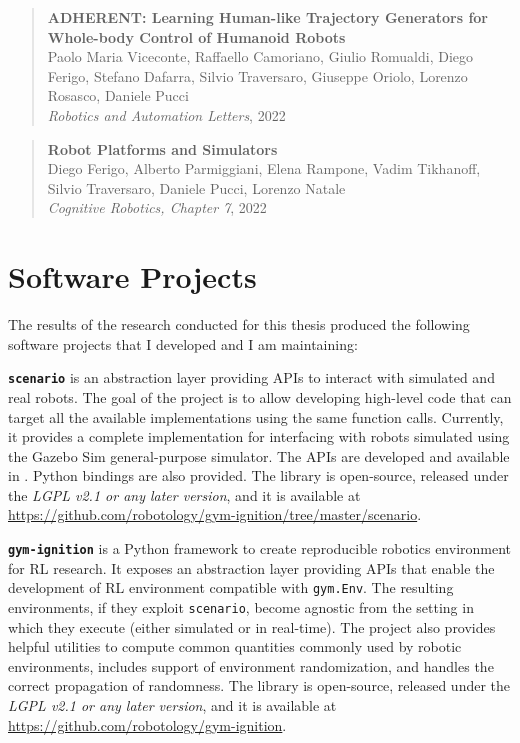 \begin{quote}
    \textbf{ADHERENT: Learning Human-like Trajectory Generators for Whole-body Control of Humanoid Robots} \\
    Paolo Maria Viceconte, Raffaello Camoriano, Giulio Romualdi, Diego Ferigo, Stefano Dafarra, Silvio Traversaro, Giuseppe Oriolo, Lorenzo Rosasco, Daniele Pucci \\
    \textit{Robotics and Automation Letters}, 2022
\end{quote}

\begin{quote}
    \textbf{Robot Platforms and Simulators} \\
    Diego Ferigo, Alberto Parmiggiani, Elena Rampone, Vadim Tikhanoff, Silvio Traversaro, Daniele Pucci, Lorenzo Natale \\
    \textit{Cognitive Robotics, Chapter 7}, 2022
\end{quote}

\section*{Software Projects}

The results of the research conducted for this thesis produced the following software projects that I developed and I am maintaining:

\vspace{3mm}
\noindent
\textbf{\texttt{scenario}} is an abstraction layer providing \acp{API} to interact with simulated and real robots. The goal of the project is to allow developing high-level code that can target all the available implementations using the same function calls. Currently, it provides a complete implementation for interfacing with robots simulated using the Gazebo Sim general-purpose simulator. The \acp{API} are developed and available in \cpp. Python bindings are also provided. The library is open-source, released under the \emph{LGPL v2.1 or any later version}, and it is available at \linebreak \url{https://github.com/robotology/gym-ignition/tree/master/scenario}.

\vspace{3mm}
\noindent
\textbf{\texttt{gym-ignition}} is a Python framework to create reproducible robotics environment for \ac{RL} research. It exposes an abstraction layer providing \acp{API} that enable the development of \ac{RL} environment compatible with \texttt{gym.Env}. The resulting environments, if they exploit \texttt{scenario},  become agnostic from the setting in which they execute (either simulated or in real-time). The project also provides helpful utilities to compute common quantities commonly used by robotic environments, includes support of environment randomization, and handles the correct propagation of randomness. The library is open-source, released under the \emph{LGPL v2.1 or any later version}, and it is available at \linebreak \url{https://github.com/robotology/gym-ignition}.

